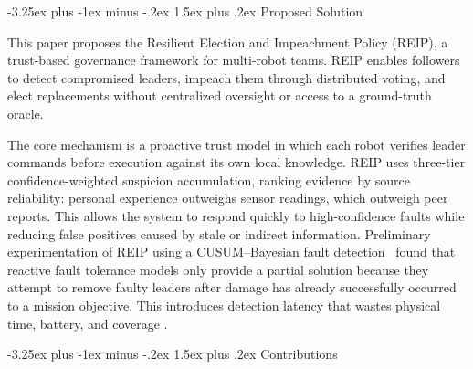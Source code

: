 \documentclass[conference]{IEEEtran}
\makeatletter
\renewcommand{\subsection}{\@startsection{subsection}{2}{\z@}%
  {-3.25ex plus -1ex minus -.2ex}%
  {1.5ex plus .2ex}%
  {\normalfont\normalsize\itshape\centering}}
\makeatother
\begin{document}
\subsection{Proposed Solution}

This paper proposes the Resilient Election and Impeachment Policy (REIP), a trust-based governance framework for multi-robot teams. REIP enables followers to detect compromised leaders, impeach them through distributed voting, and elect replacements without centralized oversight or access to a ground-truth oracle.

The core mechanism is a proactive trust model in which each robot verifies leader commands before execution against its own local knowledge. REIP uses three-tier confidence-weighted suspicion accumulation, ranking evidence by source reliability: personal experience outweighs sensor readings, which outweigh peer reports. This allows the system to respond quickly to high-confidence faults while reducing false positives caused by stale or indirect information. Preliminary experimentation of REIP using a CUSUM--Bayesian fault detection~\cite{page1954cusum, gelman2013bayesian} found that reactive fault tolerance models only provide a partial solution because they attempt to remove faulty leaders after damage has already successfully occurred to a mission objective. This introduces detection latency that wastes physical time, battery, and coverage \cite{chandola2009anomaly}.

\subsection{Contributions}
\end{document}

